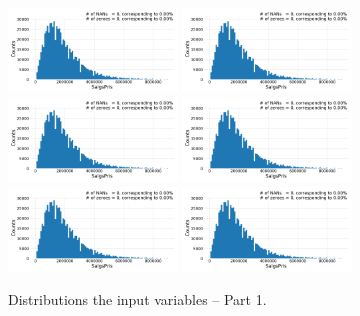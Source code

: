 \begin{figure}
  \subfloat{\qquad}
  \includegraphics[draft=false, width=0.4\textwidth, page=7, trim=15 0 15 0, clip]{figures/housing/overview_fig.pdf}\hfil
  \subfloat{\qquad}
  \includegraphics[draft=false, width=0.4\textwidth, page=8, trim=15 0 15 0, clip]{figures/housing/overview_fig.pdf}
  \subfloat{\qquad}
  \includegraphics[draft=false, width=0.4\textwidth, page=9, trim=15 0 15 0, clip]{figures/housing/overview_fig.pdf}\hfil
  \subfloat{\qquad}
  \includegraphics[draft=false, width=0.4\textwidth, page=10, trim=15 0 15 0, clip]{figures/housing/overview_fig.pdf}
  \subfloat{\qquad}
  \includegraphics[draft=false, width=0.4\textwidth, page=11, trim=15 0 15 0, clip]{figures/housing/overview_fig.pdf}\hfil
  \subfloat{\qquad}
  \includegraphics[draft=false, width=0.4\textwidth, page=12, trim=15 0 15 0, clip]{figures/housing/overview_fig.pdf}
  \caption[Distributions of the Input Variables -- Part 1]{Distributions the input variables -- Part 1.}
  \label{fig:h:variable_overview_all_1}
  \vspace{\abovecaptionskip}
\end{figure}

